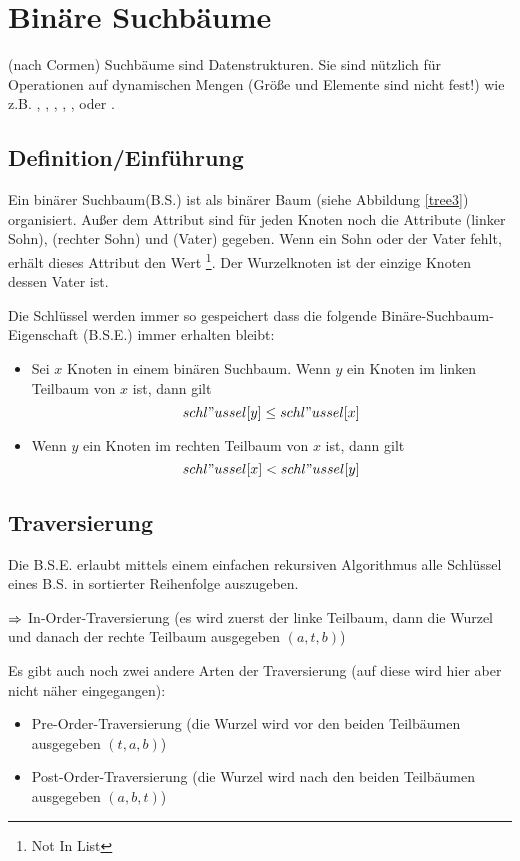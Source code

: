 \documentclass[a4paper]{scrartcl}
\begin{document}
\section{Binäre Suchbäume}
(nach Cormen) Suchbäume sind Datenstrukturen. Sie sind nützlich für Operationen auf dynamischen Mengen
(Größe und Elemente sind nicht fest!) wie z.B. , , ,
, ,  oder .

\subsection{Definition/Einführung}
Ein binärer Suchbaum(B.S.) ist als binärer Baum (siehe Abbildung \ref{tree3}) organisiert. Außer dem 
Attribut  sind für jeden Knoten noch die Attribute  (linker Sohn), 
(rechter Sohn) und (Vater) gegeben. Wenn ein Sohn oder der Vater fehlt, erhält dieses Attribut 
den Wert \footnote{Not In List}. Der Wurzelknoten ist der einzige Knoten dessen Vater  ist.

Die Schlüssel werden immer so gespeichert dass die folgende Binäre-Suchbaum-Eigenschaft (B.S.E.) immer
erhalten bleibt:
\begin{itemize}
\item Sei $x$ Knoten in einem binären Suchbaum. Wenn $y$ ein Knoten im linken Teilbaum von $x$ ist, 
			dann gilt $$ schl"ussel[y] \leq schl"ussel[x] $$
\item Wenn $y$ ein Knoten im rechten Teilbaum von $x$ ist, dann gilt
			$$ schl"ussel[x] < schl"ussel[y] $$
\end{itemize}

\subsection{Traversierung}
Die B.S.E. erlaubt mittels einem einfachen rekursiven Algorithmus alle Schlüssel eines B.S. in sortierter 
Reihenfolge auszugeben.
\begin{description}
\item{$\Rightarrow$} In-Order-Traversierung (es wird zuerst der linke Teilbaum, dann die Wurzel und danach der 
								rechte Teilbaum ausgegeben $(a,t,b)$)
\end{description}
Es gibt auch noch zwei andere Arten der Traversierung (auf diese wird hier aber nicht näher eingegangen):
\begin{itemize}
\item Pre-Order-Traversierung (die Wurzel wird vor den beiden Teilbäumen ausgegeben $(t,a,b)$)
\item Post-Order-Traversierung (die Wurzel wird nach den beiden Teilbäumen ausgegeben $(a,b,t)$)
\end{itemize}
\end{document}
